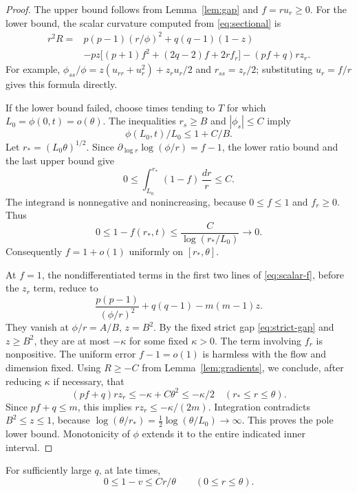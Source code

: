 \begin{proof}
The upper bound follows from Lemma~\ref{lem:gap} and \(f=ru_r\ge0\).
For the lower bound, the scalar curvature computed from
\eqref{eq:sectional} is
\begin{equation}\label{eq:scalar-f}
\begin{split}
r^2R={}&p(p-1)(r/\phi)^2+q(q-1)(1-z)\\
&-pz\bigl[(p+1)f^2+(2q-2)f+2rf_r\bigr]
 -(pf+q)rz_r.
\end{split}
\end{equation}
For example,
\(\phi_{ss}/\phi=z(u_{rr}+u_r^2)+z_ru_r/2\) and
\(r_{ss}=z_r/2\); substituting \(u_r=f/r\) gives this formula directly.

If the lower bound failed, choose times tending to \(T\) for which
\(L_0=\phi(0,t)=o(\theta)\). The inequalities \(r_s\ge B\) and
\(|\phi_s|\le C\) imply
\[
\phi(L_0,t)/L_0\le1+C/B.
\]
Let \(r_*=(L_0\theta)^{1/2}\). Since
\(\partial_{\log r}\log(\phi/r)=f-1\), the lower ratio bound and the
last upper bound give
\[
0\le\int_{L_0}^{r_*}(1-f)\,\frac{dr}{r}\le C.
\]
The integrand is nonnegative and nonincreasing, because \(0\le f\le1\)
and \(f_r\ge0\). Thus
\[
0\le1-f(r_*,t)\le\frac{C}{\log(r_*/L_0)}\longrightarrow0.
\]
Consequently \(f=1+o(1)\) uniformly on \([r_*,\theta]\).

At \(f=1\), the nondifferentiated terms in the first two lines of
\eqref{eq:scalar-f}, before the \(z_r\) term, reduce to
\[
\frac{p(p-1)}{(\phi/r)^2}+q(q-1)-m(m-1)z.
\]
They vanish at \(\phi/r=A/B\), \(z=B^2\). By the fixed strict gap
\eqref{eq:strict-gap} and \(z\ge B^2\), they are at most
\(-\kappa\) for some fixed \(\kappa>0\). The term involving \(f_r\)
is nonpositive. The uniform error \(f-1=o(1)\) is harmless with the flow
and dimension fixed. Using \(R\ge-C\) from Lemma~\ref{lem:gradients},
we conclude, after reducing \(\kappa\) if necessary, that
\[
(pf+q)rz_r\le-\kappa+C\theta^2\le-\kappa/2
\quad(r_*\le r\le\theta).
\]
Since \(pf+q\le m\), this implies \(rz_r\le-\kappa/(2m)\).
Integration contradicts \(B^2\le z\le1\), because
\(\log(\theta/r_*)=\tfrac12\log(\theta/L_0)\to\infty\).
This proves the pole lower bound. Monotonicity of \(\phi\) extends it
to the entire indicated inner interval.
\end{proof}

\begin{lemma}\label{lem:cap-slope}
For sufficiently large \(q\), at late times,
\begin{equation}\label{eq:cap-slope}
0\le1-v\le C r/\theta\qquad(0\le r\le\theta).
\end{equation}
\end{lemma}


